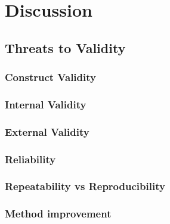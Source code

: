 \chapter{Discussion}\label{chapter:Discussion}

\section{Threats to Validity}  

\subsection{Construct Validity}


\subsection{Internal Validity}

\subsection{External Validity}

\subsection{Reliability}

\subsection{Repeatability vs Reproducibility}

\subsection{Method improvement}
